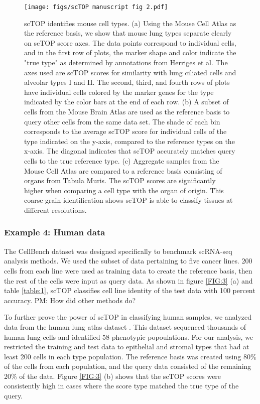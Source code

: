 \documentclass[aps,superscriptaddress, notitlepage,longbibliography]{revtex4-1}
\begin{document}
\begin{figure}
	\centering
		\texttt{[image: figs/scTOP manuscript fig 2.pdf]}
	\caption{scTOP identifies mouse cell types. (a) Using the Mouse Cell Atlas as the reference basis, we show that mouse lung types separate clearly on scTOP score axes. The data points correspond to individual cells, and in the first row of plots, the marker shape and color indicate the "true type" as determined by annotations from Herriges et al. The axes used are scTOP scores for similarity with lung ciliated cells and alveolar types I and II. The second, third, and fourth rows of plots have individual cells colored by the marker genes for the type indicated by the color bars at the end of each row. (b) A subset of cells from the Mouse Brain Atlas are used as the reference basis to query other cells from the same data set. The shade of each bin corresponds to the average scTOP score for individual cells of the type indicated on the y-axis, compared to the reference types on the x-axis. The diagonal indicates that scTOP accurately matches query cells to the true reference type. (c) Aggregate samples from the Mouse Cell Atlas are compared to a reference basis consisting of organs from Tabula Muris. The scTOP scores are significantly higher when comparing a cell type with the organ of origin. This coarse-grain identification shows scTOP is able to classify tissues at different resolutions.}
	\label{FIG:2}
\end{figure}

\subsubsection{Example 4:  Human data}

The CellBench dataset \cite{tian_benchmarking_2019} was designed specifically to benchmark scRNA-seq analysis methods. We used the subset of data pertaining to five cancer lines. 200 cells from each line were used as training data to create the reference basis, then the rest of the cells were input as query data. As shown in figure \ref{FIG:3} (a) and table \ref{table:1}, scTOP classifies cell line identity of the test data with 100 percent accuracy. {\color{red} PM: How did other methods do?}

To further prove the power of scTOP in classifying human samples, we analyzed data from the human lung atlas dataset \cite{travaglini_molecular_2020}. This dataset sequenced thousands of human lung cells and identified 58 phenotypic popoulations. For our analysis, we restricted the training and test data to epithelial and stromal types that had at least 200 cells in each type population. The reference basis was created using 80\% of the cells from each population, and the query data consisted of the remaining 20\% of the data. Figure \ref{FIG:3} (b) shows that the scTOP scores were consistently high in cases where the score type matched the true type of the query.
\end{document}
